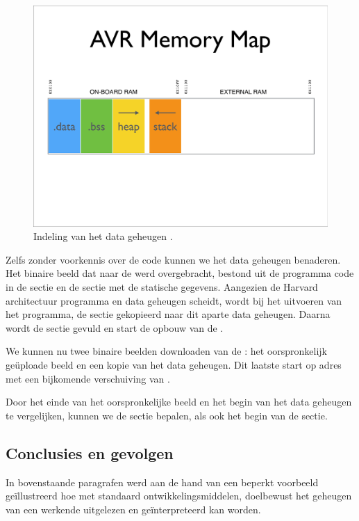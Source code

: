\begin{figure}[ht]
  \centering
  \includegraphics[width=0.9\linewidth]{resources/avr-ram-map.pdf}
  \caption{Indeling van het data geheugen \cite{avr-malloc}.}
  \label{fig:avr-ram-map}
\end{figure}

Zelfs zonder voorkennis over de code kunnen we het data geheugen benaderen. Het
binaire beeld dat naar de \mcu werd overgebracht, bestond uit de programma code
in de  sectie en de  sectie met de statische gegevens.
Aangezien de Harvard architectuur programma en data geheugen scheidt, wordt bij
het uitvoeren van het programma, de  sectie gekopieerd naar dit
aparte data geheugen. Daarna wordt de  sectie gevuld en start de
opbouw van de .

We kunnen nu twee binaire beelden downloaden van de \mcu: het oorspronkelijk
ge\"uploade beeld en een kopie van het data geheugen. Dit laatste start op
adres  met een bijkomende verschuiving van .

Door het einde van het oorspronkelijke beeld en het begin van het data geheugen
te vergelijken, kunnen we de  sectie bepalen, als ook het begin van
de  sectie.

\subsection{Conclusies en gevolgen}

In bovenstaande paragrafen werd aan de hand van een beperkt voorbeeld
ge\"illustreerd hoe met standaard ontwikkelingsmiddelen, doelbewust het
geheugen van een werkende \mcu uitgelezen en ge\"interpreteerd kan worden.

